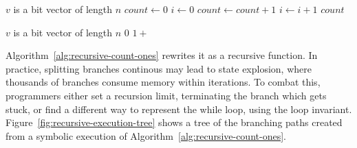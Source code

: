 \documentclass[11pt]{article}
\begin{document}
\begin{algorithm}
    \caption{Count Number of 1's in a Bit Vector}
    \label{alg:count-ones-while}
    \begin{algorithmic}[1]
    \Require $v$ is a bit vector of length $n$
    \State $count \gets 0$
    \State $i \gets 0$
            \State $count \gets count + 1$
        \EndIf
        \State $i \gets i + 1$
    \EndWhile
    \State \Return $count$
    \end{algorithmic}
\end{algorithm}

\begin{algorithm}
    \caption{Recursively Count Number of 1's in a Bit Vector}
    \label{alg:recursive-count-ones}
    \begin{algorithmic}[1]
    \Require $v$ is a bit vector of length $n$
            \State \Return $0$
            \State \Return $1 +$ 
        \Else
            \State \Return {}
        \EndIf
    \EndFunction
    \State \Return {}
    \end{algorithmic}
\end{algorithm}

Algorithm~\ref{alg:recursive-count-ones} rewrites it as a recursive function. In practice, splitting branches continous may lead to state explosion, where thousands of branches consume memory within iterations. To combat this, programmers either set a recursion limit, terminating the branch which gets stuck, or find a different way to represent the while loop, using the loop invariant. Figure~\ref{fig:recursive-execution-tree} shows a tree of the branching paths created from a symbolic execution of Algorithm~\ref{alg:recursive-count-ones}.
\end{document}
